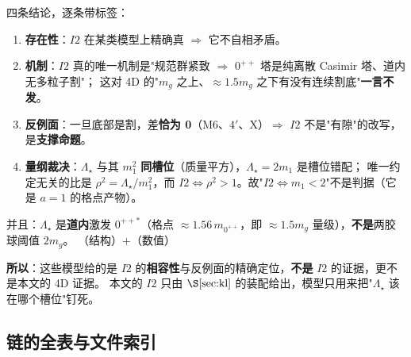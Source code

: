 四条结论，逐条带标签：

\begin{enumerate}[label=(\arabic*)]
\item \textbf{存在性}：$I2$ 在某类模型上精确真 $\Rightarrow$ 它不自相矛盾。\LT
\item \textbf{机制}：$I2$ 真的唯一机制是"规范群紧致 $\Rightarrow$ $0^{++}$ 塔是纯离散 Casimir 塔、道内无多粒子割"；
这对 4D 的"$m_g$ 之上、$\approx1.5m_g$ 之下有没有连续割底"\textbf{一言不发}。\LC
\item \textbf{反例面}：一旦底部是割，差\textbf{恰为 0}（M6、$4'$、X）$\Rightarrow$ $I2$ 不是"有隙"的改写，是\textbf{支撑命题}。\LT
\item \textbf{量纲裁决}：$\Lambda_\star$ 与其 $m_1^2$ \textbf{同槽位}（质量平方），$\Lambda_\star=2m_1$ 是槽位错配；
唯一约定无关的比是 $\rho^2=\Lambda_\star/m_1^2$，而 $I2\iff\rho^2>1$。故"$I2\iff m_1<2$"不是判据（它是 $a=1$ 的格点产物）。\LT
\end{enumerate}

并且：$\Lambda_\star$ 是\textbf{道内}激发 $0^{++*}$（格点 $\approx1.56\,m_{0^{++}}$，即 $\approx1.5m_g$ 量级），\textbf{不是}两胶球阈值 $2m_g$。
\LT{}（结构）$+$\LM（数值）

\textbf{所以}：这些模型给的是 $I2$ 的\textbf{相容性}与反例面的精确定位，\textbf{不是} $I2$ 的证据，更不是本文的 4D 证据。
本文的 $I2$ 只由 $\S\ref{sec:kl}$ 的装配给出，模型只用来把"$\Lambda_\star$ 该在哪个槽位"钉死。

\subsection{链的全表与文件索引}

